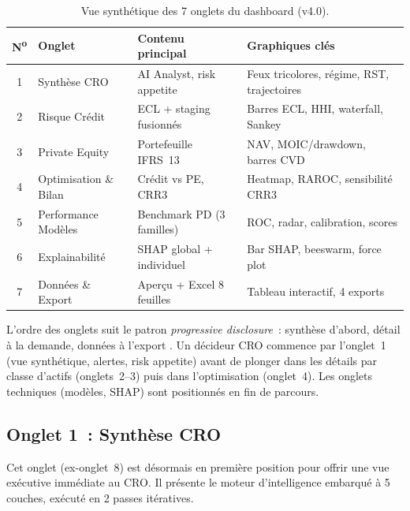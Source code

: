 \documentclass[12pt,a4paper]{article}
\begin{document}
\begin{table}[ht]
\centering
\caption{Vue synth\'etique des 7 onglets du dashboard (v4.0).}
\label{tab:onglets}
\small
\begin{tabular}{@{}clll@{}}
\toprule
\textbf{N\textsuperscript{o}} & \textbf{Onglet} & \textbf{Contenu principal} & \textbf{Graphiques cl\'es} \\
\midrule
1 & Synth\`ese CRO & AI Analyst, risk appetite & Feux tricolores, r\'egime, RST, trajectoires \\
2 & Risque Cr\'edit & ECL + staging fusionn\'es & Barres ECL, HHI, waterfall, Sankey \\
3 & Private Equity & Portefeuille IFRS~13 & NAV, MOIC/drawdown, barres CVD \\
4 & Optimisation \& Bilan & Cr\'edit vs PE, CRR3 & Heatmap, RAROC, sensibilit\'e CRR3 \\
5 & Performance Mod\`eles & Benchmark PD (3 familles) & ROC, radar, calibration, scores \\
6 & Explainabilit\'e & SHAP global + individuel & Bar SHAP, beeswarm, force plot \\
7 & Donn\'ees \& Export & Aper\c{c}u + Excel 8 feuilles & Tableau interactif, 4 exports \\
\bottomrule
\end{tabular}
\end{table}

\begin{interpretbox}
L'ordre des onglets suit le patron \emph{progressive disclosure}~: \og synth\`ese d'abord, d\'etail \`a la demande, donn\'ees \`a l'export \fg. Un d\'ecideur CRO commence par l'onglet~1 (vue synth\'etique, alertes, risk appetite) avant de plonger dans les d\'etails par classe d'actifs (onglets~2--3) puis dans l'optimisation (onglet~4). Les onglets techniques (mod\`eles, SHAP) sont positionn\'es en fin de parcours.
\end{interpretbox}


\subsection{Onglet 1~: Synth\`ese CRO}
\label{sec:tab1}

Cet onglet (ex-onglet~8) est d\'esormais en premi\`ere position pour offrir une vue ex\'ecutive imm\'ediate au CRO. Il pr\'esente le moteur d'intelligence embarqu\'e \`a 5 couches, ex\'ecut\'e en 2 passes it\'eratives.
\end{document}
